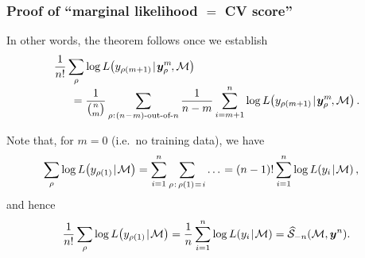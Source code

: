 \documentclass[18pt]{beamer}
\newcommand{\defineTightSpacing}{%
	\setlength{\abovedisplayskip}{.25\baselineskip}%
	\setlength{\belowdisplayskip}{.25\baselineskip}%
}
\newcommand{\given}{\thinnerspace | \thinnerspace}
\newcommand{\spacedColon}{\mkern .5mu : \mkern 1mu}
\newcommand{\spacedEq}{\mkern 1mu = \mkern 1.5mu}
\newcommand{\thinnerspace}{\mskip.5\thinmuskip}
\newcommand{\negthinnerspace}{\mskip-.5\thinmuskip}
\newcommand{\likelihood}{L}
\newcommand{\by}{\bm{y}}
\newcommand{\score}{\mathcal{S}}
\newcommand{\modelSymbol}{\mathcal{M}}
\newcommand{\permutation}{\rho}
\newcommand{\trainingSize}{m}
\newcommand{\testSampleIndex}{i}
\begin{document}
\begin{frame}
\frametitle{Proof of ``marginal likelihood $=$ {\large CV} score''}
In other words, the theorem follows once we establish
\begin{equation*} %
\begin{aligned}
&\frac{1}{n!} \sum_\permutation \log \likelihood\!\left(y_{\permutation(\trainingSize + 1)} \given \by_\permutation^\trainingSize\negthinnerspace, \modelSymbol \right) \\[-.25\baselineskip]
&\hspace*{1.5em}= \frac{1}{{n \choose \trainingSize}} \sum_{\permutation \spacedColon \text{$(n\!-\!\trainingSize)$-out-of-$n$}} 
	\frac{1}{n - \trainingSize} \sum_{\testSampleIndex = \trainingSize + 1}^n
		\log \likelihood\!\left(y_{\permutation(\trainingSize + 1)} \given \by_\permutation^\trainingSize\negthinnerspace, \modelSymbol \right).
\end{aligned}
\end{equation*}

\pause
Note that, for $\trainingSize = 0$ (i.e.\ no training data), we have 
\begin{equation*} \defineTightSpacing%
\begin{aligned}
\sum_\permutation \log \likelihood\!\left(y_{\permutation(1)} \given \modelSymbol \right)
	= \sum_{\testSampleIndex = 1}^n \sum_{\permutation \thinnerspace : \, \permutation(1) \spacedEq i} \ldots \thinnerspace
	&= (n - 1)! \sum_{\testSampleIndex = 1}^n \log \likelihood\!\left(y_\testSampleIndex \given \modelSymbol \right),
\end{aligned}
\end{equation*}
\pause
and hence
\begin{equation*} \defineTightSpacing%
\frac{1}{n!} \sum_\permutation \log \likelihood\!\left(y_{\permutation(1)} \given \modelSymbol \right)
	= \frac{1}{n} \sum_{\testSampleIndex = 1}^n \log \likelihood\!\left(y_\testSampleIndex \given \modelSymbol \right)
	= \widehat{\score}_{-n}(\modelSymbol, \by^n).
\end{equation*}
\end{frame}
\end{document}
